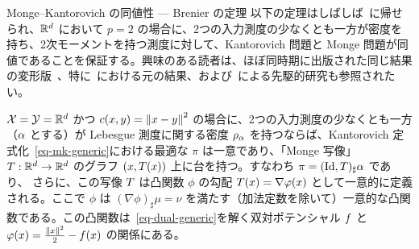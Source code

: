 \begin{rem2}{Monge--Kantorovich の同値性 --- Brenier の定理}\label{rem-exist-mongemap}
以下の定理はしばしば~\citet{Brenier91}に帰せられ、$\mathbb{R}^d$ において $p=2$ の場合に、2つの入力測度の少なくとも一方が密度を持ち、2次モーメントを持つ測度に対して、Kantorovich 問題と Monge 問題が同値であることを保証する。興味のある読者は、ほぼ同時期に出版された同じ結果の変形版~\citep{cuesta1989,ruschendorf1990characterization}、特に~\citep{MR923203}における元の結果、および~\citet{knott1984optimal}による先駆的研究も参照されたい。

\begin{thm}
	$\mathcal{X}=\mathcal{Y}=\mathbb{R}^d$ かつ $c(x,y)=\left\| x-y \right\|^2$ の場合に、2つの入力測度の少なくとも一方（$\alpha$ とする）が Lebesgue 測度に関する密度 $\rho_{\alpha}$ を持つならば、Kantorovich 定式化~\eqref{eq-mk-generic}における最適な $\pi$ は一意であり、「Monge 写像」$T : \mathbb{R}^d \rightarrow \mathbb{R}^d$ のグラフ $(x,T(x))$ 上に台を持つ。すなわち $\pi = (\mathrm{Id},T)_{\sharp} \alpha$ であり、\ie
{}
さらに、この写像 $T$ は凸関数 $\phi$ の勾配 $T(x) = \nabla\varphi(x)$ として一意的に定義される。ここで $\phi$ は $(\nabla\phi)_\sharp \mu=\nu$ を満たす（加法定数を除いて）一意的な凸関数である。この凸関数は~\eqref{eq-dual-generic}を解く双対ポテンシャル $f$ と $\varphi(x)=\frac{\left\| x \right\|^2}{2}-f(x)$ の関係にある。
\end{thm}


\end{rem2}
